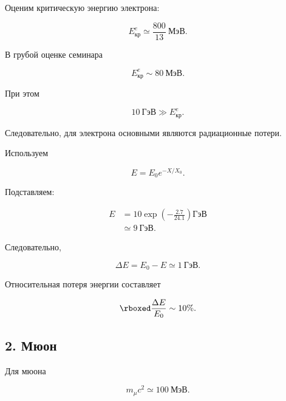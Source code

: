 \documentclass[../final.tex]{subfiles}
\begin{document}
Оценим критическую энергию электрона:

\begin{equation*}
    E_{\text{кр}}^{e}
    \simeq
    \frac{800}{13}\ \text{МэВ}.
\end{equation*}

В грубой оценке семинара

\begin{equation*}
    E_{\text{кр}}^{e}
    \sim
    80\ \text{МэВ}.
\end{equation*}

При этом

\begin{equation*}
    10\ \text{ГэВ}
    \gg
    E_{\text{кр}}^{e}.
\end{equation*}

Следовательно, для электрона основными являются
радиационные потери.

Используем

\begin{equation*}
    E
    =
    E_0
    e^{-X/X_0}.
\end{equation*}

Подставляем:

\begin{align*}
    E
    &=
    10
    \exp\left(
        -\frac{2.7}{24.1}
    \right)
    \text{ГэВ}
    \\[3pt]
    &\simeq
    9\ \text{ГэВ}.
\end{align*}

Следовательно,

\begin{equation*}
    \Delta E
    =
    E_0-E
    \simeq
    1\ \text{ГэВ}.
\end{equation*}

Относительная потеря энергии составляет

\begin{equation*}
    \rboxed{
        \frac{\Delta E}{E_0}
        \sim
        10\%
    }.
\end{equation*}


\subsection*{2. Мюон}

Для мюона

\begin{equation*}
    m_\mu c^2
    \simeq
    100\ \text{МэВ}.
\end{equation*}
\end{document}

